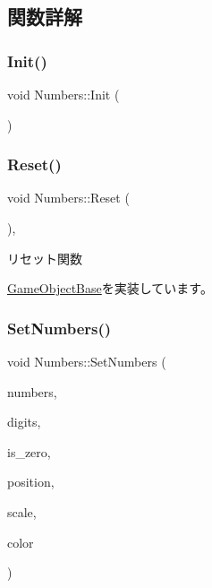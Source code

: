 \subsection{関数詳解}
\mbox{\label{class_numbers_a42158aa8dbb71308161c642aed8752e8}} 
\subsubsection{\texorpdfstring{Init()}{Init()}}
{\footnotesize\ttfamily void Numbers\+::\+Init (\begin{DoxyParamCaption}{ }\end{DoxyParamCaption})}

\mbox{\label{class_numbers_a1ab67e439ba1695c8fd545dfc1650990}} 
\subsubsection{\texorpdfstring{Reset()}{Reset()}}
{\footnotesize\ttfamily void Numbers\+::\+Reset (\begin{DoxyParamCaption}{ }\end{DoxyParamCaption})\hspace{0.3cm}{\ttfamily [override]}, {\ttfamily [virtual]}}



リセット関数 



\mbox{\hyperlink{class_game_object_base_a85c59554f734bcb09f1a1e18d9517dce}{Game\+Object\+Base}}を実装しています。

\mbox{\label{class_numbers_aeb51ecf4e148f4ca67ac7788e061f94d}} 
\subsubsection{\texorpdfstring{Set\+Numbers()}{SetNumbers()}}
{\footnotesize\ttfamily void Numbers\+::\+Set\+Numbers (\begin{DoxyParamCaption}\item[{int}]{numbers,  }\item[{int}]{digits,  }\item[{bool}]{is\+\_\+zero,  }\item[{\mbox{\hyperlink{_vector3_d_8h_a5ef6e95dfc5f9d3820b71772d99bbc25}{Vec2}}}]{position,  }\item[{\mbox{\hyperlink{_vector3_d_8h_a5ef6e95dfc5f9d3820b71772d99bbc25}{Vec2}}}]{scale,  }\item[{\mbox{\hyperlink{_vector3_d_8h_a680c30c4a07d86fe763c7e01169cd6cc}{X\+Color4}}}]{color }\end{DoxyParamCaption})}

